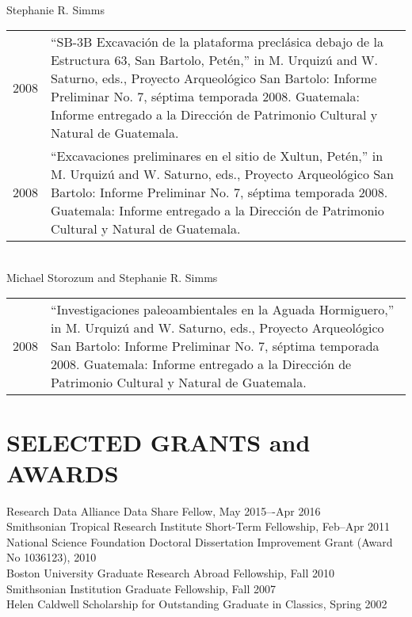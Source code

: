 \documentclass[10pt,centered]{res} %
\begin{document}
\begin{resume}
\begin{tabular}{p{.5in}p{5.25in}<{\raggedright\arraybackslash}}
\end{tabular}\\
Stephanie R. Simms\\
\begin{tabular}{p{.5in}p{5.25in}<{\raggedright\arraybackslash}}
2008 & “SB-3B Excavaci\'{o}n de la plataforma precl\'{a}sica debajo de la Estructura 63, San Bartolo, Pet\'{e}n,” in M. Urquiz\'{u} and W. Saturno, eds., Proyecto Arqueol\'{o}gico San Bartolo: Informe
Preliminar No. 7, s\'{e}ptima temporada 2008. Guatemala: Informe entregado a la Direcci\'{o}n de Patrimonio Cultural y Natural de Guatemala.\\
2008 & “Excavaciones preliminares en el sitio de Xultun, Pet\'{e}n,” in M. Urquiz\'{u} and W. Saturno, eds., Proyecto Arqueol\'{o}gico San Bartolo: Informe Preliminar No. 7, s\'{e}ptima temporada 2008. Guatemala: Informe entregado a la Direcci\'{o}n de Patrimonio Cultural y Natural de Guatemala.\\
\end{tabular}\\
Michael Storozum and Stephanie R. Simms\\
\begin{tabular}{p{.5in}p{5.25in}<{\raggedright\arraybackslash}}
2008 & “Investigaciones paleoambientales en la Aguada Hormiguero,” in M. Urquiz\'{u} and W. Saturno, eds., Proyecto Arqueol\'{o}gico San Bartolo: Informe Preliminar No. 7, s\'{e}ptima temporada 2008. Guatemala: Informe entregado a la Direcci\'{o}n de Patrimonio Cultural y Natural de Guatemala.\\
\end{tabular}

\section{\color{ResumeBlue}SELECTED GRANTS and AWARDS}
Research Data Alliance Data Share Fellow, May 2015–-Apr 2016\\
Smithsonian Tropical Research Institute Short-Term Fellowship, Feb--Apr 2011\\
National Science Foundation Doctoral Dissertation Improvement Grant (Award No 1036123), 2010 \\
Boston University Graduate Research Abroad Fellowship, Fall 2010 \\
Smithsonian Institution Graduate Fellowship, Fall 2007 \\
Helen Caldwell Scholarship for Outstanding Graduate in Classics, Spring 2002


\end{resume}
\end{document}
